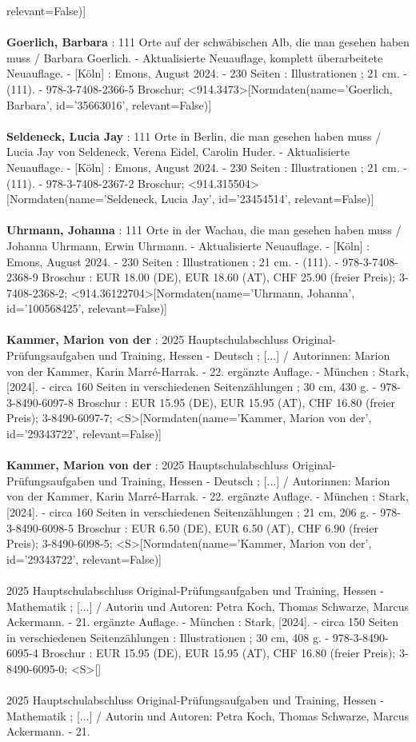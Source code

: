 \documentclass{article}
\begin{document}
\begin{multicols}{3}
relevant=False)]\\\\\textbf{Goerlich, Barbara} : 111 Orte auf der schwäbischen Alb, die man gesehen haben muss / Barbara Goerlich. - Aktualisierte Neuauflage, komplett überarbeitete Neuauflage. - [Köln] : Emons, August 2024. - 230 Seiten : Illustrationen ; 21 cm. - (111). - 978-3-7408-2366-5 Broschur; <914.3473>[Normdaten(name='Goerlich, Barbara', id='35663016', relevant=False)]\\\\\textbf{Seldeneck, Lucia Jay} : 111 Orte in Berlin, die man gesehen haben muss / Lucia Jay von Seldeneck, Verena Eidel, Carolin Huder. - Aktualisierte Neuauflage. - [Köln] : Emons, August 2024. - 230 Seiten : Illustrationen ; 21 cm. - (111). - 978-3-7408-2367-2 Broschur; <914.315504>[Normdaten(name='Seldeneck, Lucia Jay', id='23454514', relevant=False)]\\\\\textbf{Uhrmann, Johanna} : 111 Orte in der Wachau, die man gesehen haben muss / Johanna Uhrmann, Erwin Uhrmann. - Aktualisierte Neuauflage. - [Köln] : Emons, August 2024. - 230 Seiten : Illustrationen ; 21 cm. - (111). - 978-3-7408-2368-9 Broschur : EUR 18.00 (DE), EUR 18.60 (AT), CHF 25.90 (freier Preis); 3-7408-2368-2; <914.36122704>[Normdaten(name='Uhrmann, Johanna', id='100568425', relevant=False)]\\\\\textbf{Kammer, Marion von der} : 2025 Hauptschulabschluss Original-Prüfungsaufgaben und Training, Hessen - Deutsch ; [...] / Autorinnen: Marion von der Kammer, Karin Marré-Harrak. - 22. ergänzte Auflage. - München : Stark, [2024]. - circa 160 Seiten in verschiedenen Seitenzählungen ; 30 cm, 430 g. - 978-3-8490-6097-8 Broschur : EUR 15.95 (DE), EUR 15.95 (AT), CHF 16.80 (freier Preis); 3-8490-6097-7; <S>[Normdaten(name='Kammer, Marion von der', id='29343722', relevant=False)]\\\\\textbf{Kammer, Marion von der} : 2025 Hauptschulabschluss Original-Prüfungsaufgaben und Training, Hessen - Deutsch ; [...] / Autorinnen: Marion von der Kammer, Karin Marré-Harrak. - 22. ergänzte Auflage. - München : Stark, [2024]. - circa 160 Seiten in verschiedenen Seitenzählungen ; 21 cm, 206 g. - 978-3-8490-6098-5 Broschur : EUR 6.50 (DE), EUR 6.50 (AT), CHF 6.90 (freier Preis); 3-8490-6098-5; <S>[Normdaten(name='Kammer, Marion von der', id='29343722', relevant=False)]\\\\2025 Hauptschulabschluss Original-Prüfungsaufgaben und Training, Hessen - Mathematik ; [...] / Autorin und Autoren: Petra Koch, Thomas Schwarze, Marcus Ackermann. - 21. ergänzte Auflage. - München : Stark, [2024]. - circa 150 Seiten in verschiedenen Seitenzählungen : Illustrationen ; 30 cm, 408 g. - 978-3-8490-6095-4 Broschur : EUR 15.95 (DE), EUR 15.95 (AT), CHF 16.80 (freier Preis); 3-8490-6095-0; <S>[]\\\\2025 Hauptschulabschluss Original-Prüfungsaufgaben und Training, Hessen - Mathematik ; [...] / Autorin und Autoren: Petra Koch, Thomas Schwarze, Marcus Ackermann. - 21. 
\end{multicols}
\end{document}
